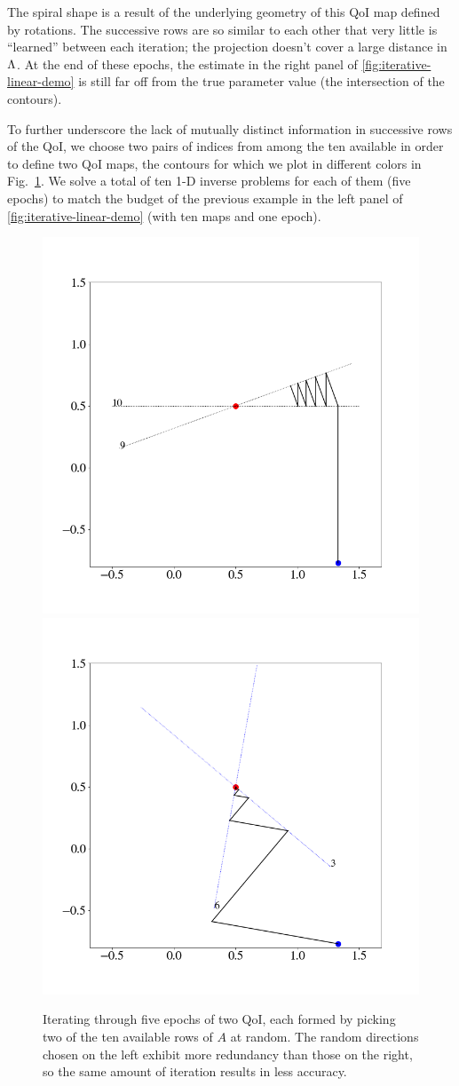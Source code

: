 The spiral shape is a result of the underlying geometry of this QoI map defined by rotations. The successive rows are so similar to each other that very little is ``learned'' between each iteration; the projection doesn't cover a large distance in ${\Lambda}$.
At the end of these epochs, the estimate in the right panel of \ref{fig:iterative-linear-demo} is still far off from the true parameter value (the intersection of the contours).

To further underscore the lack of mutually distinct information in successive rows of the QoI, we choose two pairs of indices from among the ten available in order to define two QoI maps, the contours for which we plot in different colors in Fig.~\ref{fig:iterative-linear-demo-pair}.
We solve a total of ten 1-D inverse problems for each of them (five epochs) to match the budget of the previous example in the left panel of \ref{fig:iterative-linear-demo} (with ten maps and one epoch).

\begin{figure}
  \centering
  \includegraphics[width=0.475\linewidth]{examples/iterative/10D-fewepochs-pair.png}
  \includegraphics[width=0.475\linewidth]{examples/iterative/10D-fewepochs-pair-alt.png}
  \caption{
  Iterating through five epochs of two QoI, each formed by picking two of the ten available rows of $A$ at random.
  The random directions chosen on the left exhibit more redundancy than those on the right, so the same amount of iteration results in less accuracy.
  }
  \label{fig:iterative-linear-demo-pair}
\end{figure}

